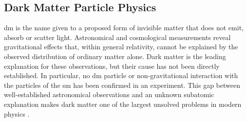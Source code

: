 \subsection{Dark Matter Particle Physics}
\label{sec:dm_particle_physics}



\Gls{dm} is the name given to a proposed form of invisible matter that does not
emit, absorb or scatter light. Astronomical and cosmological measurements reveal
gravitational effects that, within general relativity, cannot be explained by the
observed distribution of ordinary matter alone. Dark matter is the leading
explanation for these observations, but their cause has not been directly
established. In particular, no \gls{dm} particle or non-gravitational interaction
with the particles of the \gls{sm} has been confirmed in an experiment. This gap
between well-established astronomical observations and an unknown subatomic
explanation makes dark matter one of the largest unsolved problems in modern
physics \cite{bertone2016-history-dark-matter,cirelli2026-darkmatter}.


